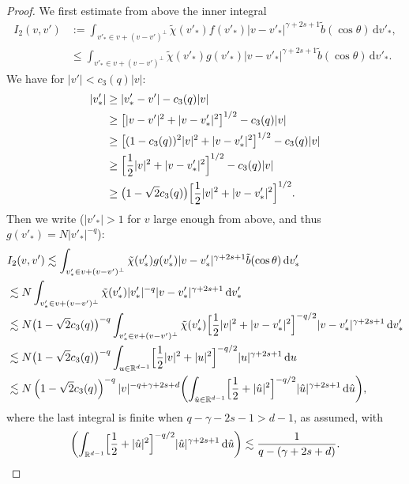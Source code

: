 \documentclass[JEP,XML,SOM,Unicode,NoFloatCountersInSection]{cedram}
\theoremstyle{plain}
\theoremstyle{definition}
\numberwithin{equation}{section}
\newcommand{\R}{\mathbb R}
\newcommand{\dd} {\, \mathrm{d}}
\let\A N
\begin{document}
\begin{proof}
We first estimate from above the inner integral
\[
\begin{aligned}
I_2(v,v') &:= \int_{v'_* \in v + (v-v')^\bot} \tilde \chi(v'_*) f(v'_*)
|v-v'_*|^{\gamma+2s +1} \tilde b(\cos \theta) \dd v'_* , \\
&\leq \int_{v'_* \in v + (v-v')^\bot} \tilde \chi(v'_*) g(v'_*)
|v-v'_*|^{\gamma+2s +1} \tilde b(\cos \theta) \dd v'_* .
\end{aligned}
\]
We have for $|v'|< c_3(q) |v|$:
\begin{align*}
|v'_*| &\ge |v'_*-v'|- c_3(q) |v| \\
& \ge \big[|v-v'|^2+|v-v'_*|^2\big]^{1/2} - c_3(q) |v| \\
& \ge \big[ (1-c_3(q))^2|v|^2 + |v-v'_*|^2\big]^{1/2} - c_3(q) |v|\\
& \ge \Bigl[ \frac12 |v|^2 + |v-v'_*|^2\Bigr]^{1/2} - c_3(q) |v|\\
& \ge \bigl(1-\sqrt 2c_3(q)\bigr) \Bigl[ \frac12|v|^2 + |v-v'_*|^2 \Bigr]^{1/2}.
\end{align*}
Then we write ($|v'_*| >1$ for $v$ large enough from above, and thus
$g(v'_*) = \A |v'_*|^{-q}$):
\begin{align*}
&I_2(v,v') \lesssim \int_{v'_* \in v + (v-v')^\bot} \tilde \chi(v'_*) g(v'_*)
|v-v'_*|^{\gamma+2s +1} \tilde b(\cos \theta) \dd v'_* \\
&\lesssim \A \int_{v'_* \in v + (v-v')^\bot} \tilde \chi(v'_*) |v'_*|^{-q}
|v-v'_*|^{\gamma+2s +1} \dd v'_* \\
&\lesssim \A \bigl(1-\sqrt{2} c_3(q) \bigr)^{-q} \int_{v'_* \in v + (v-v')^\bot} \tilde \chi(v'_*)
\Bigl[ \frac12 |v|^2 + |v-v'_*|^2\Bigr]^{-q/2}
|v-v'_*|^{\gamma+2s +1} \dd v'_* \\
&\lesssim \A \bigl(1-\sqrt{2} c_3(q) \bigr)^{-q} \int_{u \in
\R^{d-1}}
\Bigl[ \frac12 |v|^2 + |u|^2\Bigl]^{-q/2} |u|^{\gamma+2s +1} \dd u \\
&\lesssim \A \left(1-\sqrt 2 c_3(q)\right)^{-q} |v|^{-q+\gamma+2s +d}
\biggl( \int_{\hat u \in
\R^{d-1}}
\Bigl[ \frac12 + |\hat u|^2\Bigr]^{-q/2} |\hat u|^{\gamma+2s +1}
\dd \hat u \biggr),
\end{align*}
where the last integral is finite when $q -\gamma-2s -1 > d-1$, as
assumed, with
\begin{equation*}
\biggl( \int_{\R^{d-1}} \Bigl[ \frac12 + |\hat u|^2\Bigr]^{-q/2} |\hat u|^{\gamma+2s +1}
\dd \hat u \biggr) \lesssim \frac{1}{q - (\gamma+2s+d)}.
\end{equation*}


\end{proof}
\end{document}
